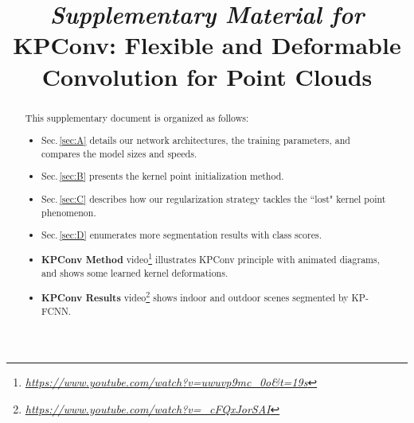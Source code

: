 \documentclass[10pt,twocolumn,letterpaper]{article}
\begin{document}
\clearpage





\pretitle{\vspace{10ex}}
\posttitle{\vspace{10ex}}
\title{\textit{Supplementary Material for} \\ KPConv: Flexible and Deformable Convolution for Point Clouds}
\preauthor{}
\postauthor{}
\author{}

\maketitle

\renewcommand{\thesection}{\Alph{section}}
\setcounter{section}{0}




\begin{abstract}
\noindent
This supplementary document is organized as follows:
\begin{itemize}
    \itemsep 0ex 
    \item Sec.\,\ref{sec:A} details our network architectures, the training parameters, and compares the model sizes and speeds.
    \item Sec.\,\ref{sec:B} presents the kernel point initialization method.
    \item Sec.\,\ref{sec:C} describes how our regularization strategy tackles the ``lost" kernel point phenomenon.
    \item Sec.\,\ref{sec:D} enumerates more segmentation results with class scores.
    \item \textbf{KPConv Method} video\footnote{\textit{\url{https://www.youtube.com/watch?v=uwuvp9mc_0o&t=19s}}} illustrates KPConv principle with animated diagrams, and shows some learned kernel deformations.
    \item \textbf{KPConv Results} video\footnote{\textit{\url{https://www.youtube.com/watch?v=_cFQxJorSAI}}}  shows indoor and outdoor scenes segmented by KP-FCNN.
\end{itemize}
\end{abstract}
\end{document}
